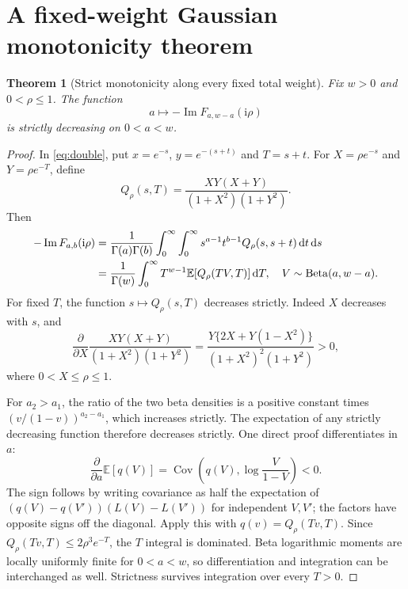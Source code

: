 \documentclass[11pt]{article}
\numberwithin{equation}{section}
\newtheorem{theorem}{Theorem}[section]
\theoremstyle{definition}
\theoremstyle{remark}
\DeclareMathOperator{\Cov}{Cov}
\DeclareMathOperator{\Impart}{Im}
\newcommand{\dd}{\,\mathrm d}
\newcommand{\ii}{\mathrm i}
\newcommand{\E}{\mathbb E}
\begin{document}
\section{A fixed-weight Gaussian monotonicity theorem}
\label{sec:gaussian}
\begin{theorem}[Strict monotonicity along every fixed total weight]
\label{thm:weightmonotonicity}
Fix $w>0$ and $0<\rho\le1$. The function
\begin{equation}\label{eq:fixedweight}
 a\longmapsto-\Impart F_{a,w-a}(\ii\rho)
\end{equation}
is strictly decreasing on $0<a<w$.
\end{theorem}
\begin{proof}
In \eqref{eq:double}, put $x=e^{-s}$, $y=e^{-(s+t)}$ and $T=s+t$.
For $X=\rho e^{-s}$ and $Y=\rho e^{-T}$, define
\begin{equation}\label{eq:Q}
 Q_\rho(s,T)=\frac{XY(X+Y)}{(1+X^2)(1+Y^2)}.
\end{equation}
Then
\begin{align}
 -\Impart F_{a,b}(\ii\rho)
 &=\frac1{\Gamma(a)\Gamma(b)}
   \int_0^\infty\int_0^\infty
          s^{a-1}t^{b-1}Q_\rho(s,s+t)\dd t\dd s\notag\\
 &=\frac1{\Gamma(w)}\int_0^\infty T^{w-1}
       \E[Q_\rho(TV,T)]\dd T,
 \quad V\sim\operatorname{Beta}(a,w-a).
 \label{eq:beta-gaussian}
\end{align}
For fixed $T$, the function $s\mapsto Q_\rho(s,T)$ decreases strictly.
Indeed $X$ decreases with $s$, and
\begin{equation}\label{eq:Qderivative}
 \frac{\partial}{\partial X}
 \frac{XY(X+Y)}{(1+X^2)(1+Y^2)}
 =\frac{Y\{2X+Y(1-X^2)\}}
 {(1+X^2)^2(1+Y^2)}>0,
\end{equation}
where $0<X\le\rho\le1$.

For $a_2>a_1$, the ratio of the two beta densities is a positive
constant times $(v/(1-v))^{a_2-a_1}$, which increases strictly. The
expectation of any strictly decreasing function therefore decreases
strictly. One direct proof differentiates in $a$:
\begin{equation}\label{eq:covariance}
 \frac{\partial}{\partial a}\E[q(V)]
 =\Cov\left(q(V),\log\frac V{1-V}\right)<0.
\end{equation}
The sign follows by writing covariance as half the expectation of
$(q(V)-q(V'))(L(V)-L(V'))$ for independent $V,V'$; the factors have
opposite signs off the diagonal. Apply this with $q(v)=Q_\rho(Tv,T)$.
Since $Q_\rho(Tv,T)\le2\rho^3e^{-T}$, the $T$ integral is dominated.
Beta logarithmic moments are locally uniformly finite for $0<a<w$,
so differentiation and integration can be interchanged as well.
Strictness survives integration over every $T>0$.
\end{proof}
\end{document}

